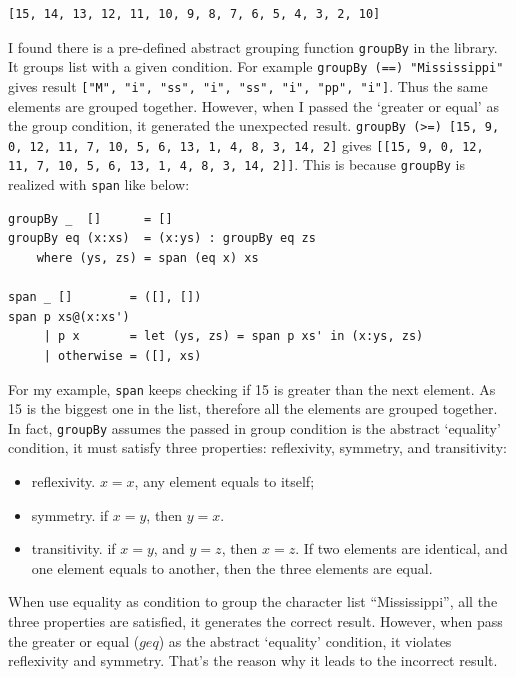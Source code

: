 \documentclass{article}
\begin{document}
\begin{verbatim}
[15, 14, 13, 12, 11, 10, 9, 8, 7, 6, 5, 4, 3, 2, 10]
\end{verbatim}

I found there is a pre-defined abstract grouping function \texttt{groupBy} in the library. It groups list with a given condition. For example \texttt{groupBy (==) "Mississippi"} gives result \texttt{["M", "i", "ss", "i", "ss", "i", "pp", "i"]}. Thus the same elements are grouped together. However, when I passed the `greater or equal' as the group condition, it generated the unexpected result. \texttt{groupBy (>=) [15, 9, 0, 12, 11, 7, 10, 5, 6, 13, 1, 4, 8, 3, 14, 2]} gives \texttt{[[15, 9, 0, 12, 11, 7, 10, 5, 6, 13, 1, 4, 8, 3, 14, 2]]}. This is because \texttt{groupBy} is realized with \texttt{span} like below:

\lstset{language=Haskell, frame=single}
\begin{lstlisting}
groupBy _  []      = []
groupBy eq (x:xs)  = (x:ys) : groupBy eq zs
    where (ys, zs) = span (eq x) xs

span _ []        = ([], [])
span p xs@(x:xs')
     | p x       = let (ys, zs) = span p xs' in (x:ys, zs)
     | otherwise = ([], xs)
\end{lstlisting}

For my example, \texttt{span} keeps checking if 15 is greater than the next element. As 15 is the biggest one in the list, therefore all the elements are grouped together. In fact, \texttt{groupBy} assumes the passed in group condition is the abstract `equality' condition, it must satisfy three properties: reflexivity, symmetry, and transitivity:

\begin{itemize}
\item reflexivity. $x = x$, any element equals to itself;
\item symmetry. if $x = y$, then $y = x$.
\item transitivity. if $x = y$, and $y = z$, then $x = z$. If two elements are identical, and one element equals to another, then the three elements are equal.
\end{itemize}

When use equality as condition to group the character list ``Mississippi'', all the three properties are satisfied, it generates the correct result. However, when pass the greater or equal ($geq$) as the abstract `equality' condition, it violates reflexivity and symmetry. That's the reason why it leads to the incorrect result.
\end{document}
